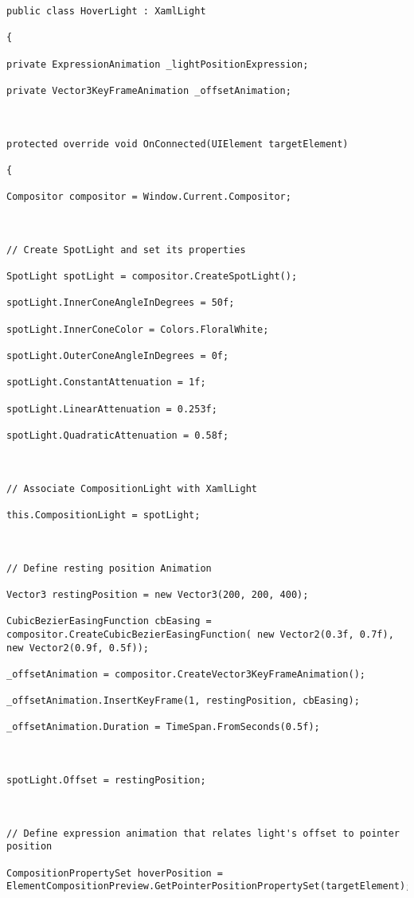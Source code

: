 \begin{lstlisting}[style=CSharpStyle]
public class HoverLight : XamlLight 

{

private ExpressionAnimation _lightPositionExpression;

private Vector3KeyFrameAnimation _offsetAnimation;



protected override void OnConnected(UIElement targetElement)

{

Compositor compositor = Window.Current.Compositor;



// Create SpotLight and set its properties

SpotLight spotLight = compositor.CreateSpotLight();

spotLight.InnerConeAngleInDegrees = 50f;

spotLight.InnerConeColor = Colors.FloralWhite;

spotLight.OuterConeAngleInDegrees = 0f;

spotLight.ConstantAttenuation = 1f;

spotLight.LinearAttenuation = 0.253f;

spotLight.QuadraticAttenuation = 0.58f;



// Associate CompositionLight with XamlLight

this.CompositionLight = spotLight;



// Define resting position Animation

Vector3 restingPosition = new Vector3(200, 200, 400);

CubicBezierEasingFunction cbEasing = compositor.CreateCubicBezierEasingFunction( new Vector2(0.3f, 0.7f), new Vector2(0.9f, 0.5f));

_offsetAnimation = compositor.CreateVector3KeyFrameAnimation();

_offsetAnimation.InsertKeyFrame(1, restingPosition, cbEasing);

_offsetAnimation.Duration = TimeSpan.FromSeconds(0.5f);



spotLight.Offset = restingPosition;



// Define expression animation that relates light's offset to pointer position 

CompositionPropertySet hoverPosition = ElementCompositionPreview.GetPointerPositionPropertySet(targetElement);


\end{lstlisting}
